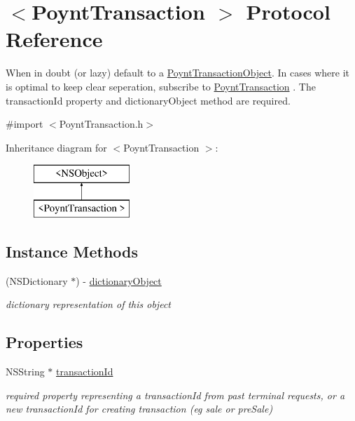 \hypertarget{protocol_poynt_transaction_01-p}{}\section{$<$Poynt\+Transaction $>$ Protocol Reference}
\label{protocol_poynt_transaction_01-p}


When in doubt (or lazy) default to a \hyperlink{interface_poynt_transaction_object}{Poynt\+Transaction\+Object}. In cases where it is optimal to keep clear seperation, subscribe to \hyperlink{class_poynt_transaction-p}{Poynt\+Transaction} . The transaction\+Id property and dictionary\+Object method are required.  




{\ttfamily \#import $<$Poynt\+Transaction.\+h$>$}

Inheritance diagram for $<$Poynt\+Transaction $>$\+:\begin{figure}[H]
\begin{center}
\leavevmode
\includegraphics[height=2.000000cm]{protocol_poynt_transaction_01-p}
\end{center}
\end{figure}
\subsection*{Instance Methods}
\begin{DoxyCompactItemize}
\item 
(N\+S\+Dictionary $\ast$) -\/ \hyperlink{protocol_poynt_transaction_01-p_a2482f2e9af7fe8eec4ba9710cdc963ee}{dictionary\+Object}
\begin{DoxyCompactList}\small\item\em dictionary representation of this object \end{DoxyCompactList}\end{DoxyCompactItemize}
\subsection*{Properties}
\begin{DoxyCompactItemize}
\item 
N\+S\+String $\ast$ \hyperlink{protocol_poynt_transaction_01-p_aacd11580c330a78310c344d78baecf8c}{transaction\+Id}
\begin{DoxyCompactList}\small\item\em required property representing a transaction\+Id from past terminal requests, or a new transaction\+Id for creating transaction (eg sale or pre\+Sale) \end{DoxyCompactList}\end{DoxyCompactItemize}


